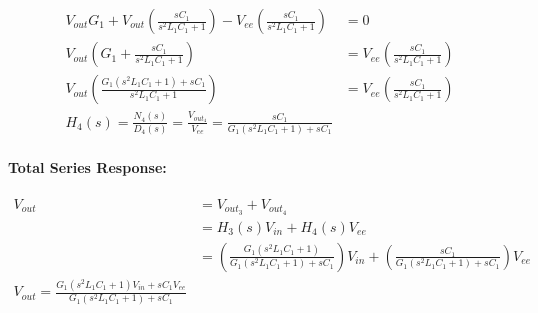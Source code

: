\begin{enumerate}
\begin{enumerate}
\begin{align*}
            V_{out}G_1 + V_{out}\left(\frac{sC_1}{s^2L_1C_1 + 1}\right) - V_{ee}\left(\frac{sC_1}{s^2L_1C_1 + 1}\right) &= 0 \\
            V_{out}\left(G_1 + \frac{sC_1}{s^2L_1C_1 + 1}\right) &= V_{ee}\left(\frac{sC_1}{s^2L_1C_1 + 1}\right) \\
            V_{out}\left(\frac{G_1(s^2L_1C_1 + 1) + sC_1}{s^2L_1C_1 + 1}\right) &= V_{ee}\left(\frac{sC_1}{s^2L_1C_1 + 1}\right) \\
            \boxed{H_4(s) = \frac{N_4(s)}{D_4(s)} = \frac{V_{out_4}}{V_{ee}} = \frac{sC_1}{G_1(s^2L_1C_1 + 1) + sC_1}}
          \end{align*}
      \end{enumerate}
    \paragraph{Total Series Response:}
      \begin{align*}
        V_{out} &= V_{out_3} + V_{out_4} \\
                &= H_3(s)V_{in} + H_4(s)V_{ee} \\
                &= \left(\frac{G_1(s^2L_1C_1 + 1)}{G_1(s^2L_1C_1 + 1) + sC_1}\right)V_{in} + \left(\frac{sC_1}{G_1(s^2L_1C_1 + 1) + sC_1}\right)V_{ee} \\
        \boxed{V_{out} = \frac{G_1(s^2L_1C_1 + 1)V_{in} + sC_1V_{ee}}{G_1(s^2L_1C_1 + 1) + sC_1}}
      \end{align*}
\end{enumerate}

